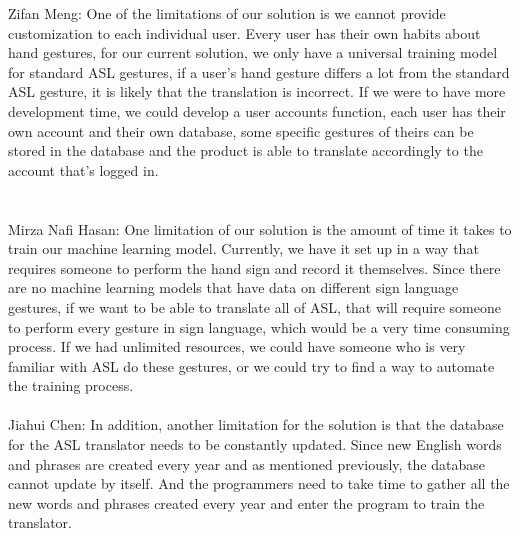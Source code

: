 \documentclass[12pt, titlepage]{article}
\begin{document}
\begin{enumerate}
  Zifan Meng: One of the limitations of our solution is we cannot provide customization to each individual user. Every user has their own habits about
  hand gestures, for our current solution, we only have a universal training model for standard ASL gestures, if a user’s hand gesture differs a lot 
  from the standard ASL gesture, it is likely that the translation is incorrect. If we were to have more development time, we could develop a user accounts
  function, each user has their own account and their own database, some specific gestures of theirs can be stored in the database and the product is 
  able to translate accordingly to the account that’s logged in.
  \\
   ~\\
  \\
    Mirza Nafi Hasan: One limitation of our solution is the amount of time it takes to train our machine learning model. Currently, we have it set up in a way 
that requires someone to perform the hand sign and record it themselves. Since there are no machine learning models that have data on different sign language
gestures, if we want to be able to translate all of ASL, that will require someone to perform every gesture in sign language, which would be a very time 
consuming process. If we had unlimited resources, we could have someone who is very familiar with ASL do these gestures, or we could try to find a way to
automate the training process.
  \\
  ~\\


  Jiahui Chen: In addition, another limitation for the solution is that the database for the ASL translator needs to be constantly updated. Since new English words and phrases are created every year and as mentioned previously, the database cannot update by itself. And the programmers need to take time to gather all the new words and phrases created every year and enter the program to train the translator. 
  \\
  ~\\
 \\
  

\end{enumerate}
\end{document}
